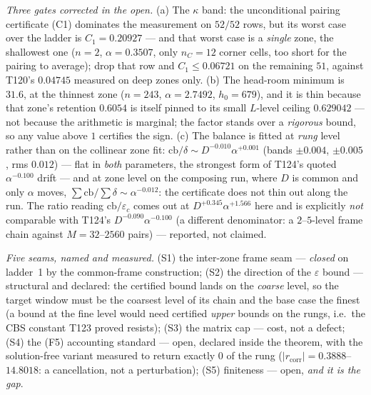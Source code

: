 \documentclass[11pt,a4paper]{article}
\begin{document}
\emph{Three gates corrected in the open.} (a) The $\kappa$ band: the unconditional pairing
certificate (C1) dominates the measurement on $52/52$ rows, but its worst case over the ladder is
$C_1=0.20927$ --- and that worst case is a \emph{single} zone, the shallowest one ($n=2$,
$\alpha=0.3507$, only $n_C=12$ corner cells, too short for the pairing to average); drop that row
and $C_1\le0.06721$ on the remaining $51$, against T120's $0.04745$ measured on deep zones only.
(b) The head-room minimum is $31.6$, at the thinnest zone ($n=243$, $\alpha=2.7492$, $h_0=679$), and
it is thin because that zone's retention $0.6054$ is itself pinned to its small $L$-level ceiling
$0.629042$ --- not because the arithmetic is marginal; the factor stands over a \emph{rigorous}
bound, so any value above $1$ certifies the sign. (c) The balance is fitted at \emph{rung} level
rather than on the collinear zone fit: $\mathrm{cb}/\delta\sim D^{-0.010}\alpha^{+0.001}$ (bands
$\pm0.004$, $\pm0.005$, rms $0.012$) --- flat in \emph{both} parameters, the strongest form of
T124's quoted $\alpha^{-0.100}$ drift --- and at zone level on the composing run, where $D$ is
common and only $\alpha$ moves, $\sum\mathrm{cb}/\sum\delta\sim\alpha^{-0.012}$: the certificate does
not thin out along the run. The ratio reading $\mathrm{cb}/\varepsilon_c$ comes out at
$D^{+0.345}\alpha^{+1.566}$ here and is explicitly \emph{not} comparable with T124's
$D^{-0.090}\alpha^{-0.100}$ (a different denominator: a $2$--$5$-level frame chain against
$M=32$--$2560$ pairs) --- reported, not claimed.

\emph{Five seams, named and measured.} (S1) the inter-zone frame seam --- \emph{closed} on ladder~1
by the common-frame construction; (S2) the direction of the $\varepsilon$ bound --- structural and
declared: the certified bound lands on the \emph{coarse} level, so the target window must be the
coarsest level of its chain and the base case the finest (a bound at the fine level would need
certified \emph{upper} bounds on the rungs, i.e.\ the CBS constant T123 proved resists); (S3) the
matrix cap --- cost, not a defect; (S4) the (F5) accounting standard --- open, declared inside the
theorem, with the solution-free variant measured to return exactly $0$ of the rung
($|r_{\mathrm{corr}}|=0.3888$--$14.8018$: a cancellation, not a perturbation); (S5) finiteness ---
open, \emph{and it is the gap}.
\end{document}
